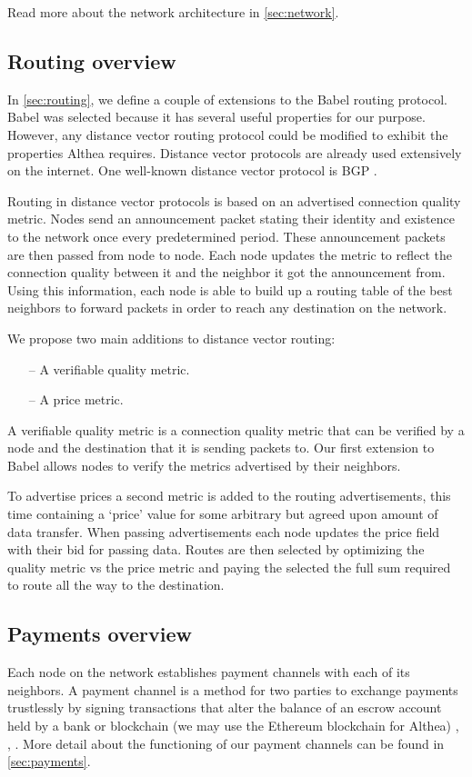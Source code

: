 \documentclass[11pt]{article}
\newlength{\currentparskip}
\newenvironment{unbreakable}
  {\setlength{\currentparskip}{\parskip}%
	 \vspace{\currentparskip}
   \begin{minipage}{\textwidth}%
   \setlength{\parskip}{\currentparskip}%
  }
  {\end{minipage}\vspace{\currentparskip}}
\begin{document}
Read more about the network architecture in \autoref{sec:network}.

\subsection{Routing overview}
In \autoref{sec:routing}, we define a couple of extensions to the Babel routing protocol. Babel was selected because it has several useful properties for our purpose. However, any distance vector routing protocol could be modified to exhibit the properties Althea requires. Distance vector protocols are already used extensively on the internet. One well-known distance vector protocol is BGP \cite{bgp}.
 
Routing in distance vector protocols is based on an advertised connection quality metric. Nodes send an announcement packet stating their identity and existence to the network once every predetermined period. These announcement packets are then passed from node to node. Each node updates the metric to reflect the connection quality between it and the neighbor it got the announcement from. Using this information, each node is able to build up a routing table of the best neighbors to forward packets in order to reach any destination on the network.

\begin{unbreakable}
We propose two main additions to distance vector routing:
\begin{itemize}
\item[--] A verifiable quality metric.
\item[--] A price metric.
\end{itemize}
\end{unbreakable}

A verifiable quality metric is a connection quality metric that can be verified by a node and the destination that it is sending packets to. Our first extension to Babel allows nodes to verify the metrics advertised by their neighbors.
 
To advertise prices a second metric is added to the routing advertisements, this time containing a ‘price’ value for some arbitrary but agreed upon amount of data transfer. When passing advertisements each node updates the price field with their bid for passing data. Routes are then selected by optimizing the quality metric vs the price metric and paying the selected the full sum required to route all the way to the destination. 

\subsection{Payments overview}
Each node on the network establishes payment channels with each of its neighbors. A payment channel is a method for two parties to exchange payments trustlessly by signing transactions that alter the balance of an escrow account held by a bank or blockchain (we may use the Ethereum blockchain for Althea) \cite{btcwiki}, \cite{bitcoinj}, \cite{machinomy}. More detail about the functioning of our payment channels can be found in \autoref{sec:payments}.
 
\end{document}
